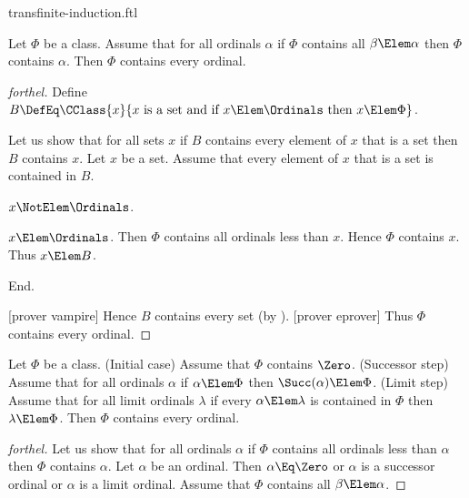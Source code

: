 \documentclass{stex}
\begin{document}
\begin{smodule}{transfinite-induction.ftl}



\begin{theorem*}[forthel,title=Transfinite Induction I,name=transfinite induction I]
  Let $\Phi$ be a class.
  Assume that for all ordinals $\alpha$ if $\Phi$ contains all $\beta \Elem \alpha$ then $\Phi$ contains $\alpha$.
  Then $\Phi$ contains every ordinal.
\end{theorem*}
\begin{proof}[forthel]
  Define $B \DefEq \CClass{x}{x\text{ is a set and if }x \Elem \Ordinals\text{ then }x \Elem \Phi}$.

  Let us show that for all sets $x$ if $B$ contains every element of $x$ that is a set then $B$ contains $x$.
    Let $x$ be a set.
    Assume that every element of $x$ that is a set is contained in $B$.

    \begin{case}{$x \NotElem \Ordinals$.} \end{case}

    \begin{case}{$x \Elem \Ordinals$.}
      Then $\Phi$ contains all ordinals less than $x$.
      Hence $\Phi$ contains $x$.
      Thus $x \Elem B$.
    \end{case}
  End.

  [prover vampire]
  Hence $B$ contains every set (by ).
  [prover eprover]
  Thus $\Phi$ contains every ordinal.
\end{proof}

\begin{theorem*}[forthel,title=Transfinite Induction II,name=transfinite induction II]
  Let $\Phi$ be a class.
  (Initial case) Assume that $\Phi$ contains $\Zero$.
  (Successor step) Assume that for all ordinals $\alpha$ if $\alpha \Elem \Phi$ then $\Succ(\alpha) \Elem \Phi$.
  (Limit step) Assume that for all limit ordinals $\lambda$ if every $\alpha \Elem \lambda$ is contained in $\Phi$ then $\lambda \Elem \Phi$.
  Then $\Phi$ contains every ordinal.
\end{theorem*}
\begin{proof}[forthel]
  Let us show that for all ordinals $\alpha$ if $\Phi$ contains all ordinals
  less than $\alpha$ then $\Phi$ contains $\alpha$.
    Let $\alpha$ be an ordinal.
    Then $\alpha \Eq \Zero$ or $\alpha$ is a successor ordinal or $\alpha$ is a
    limit ordinal.
    Assume that $\Phi$ contains all $\beta \Elem \alpha$.


\end{proof}
\end{smodule}
\end{document}
